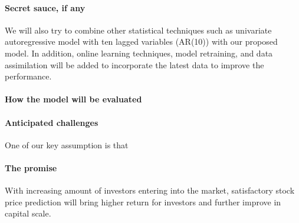 \documentclass{article}
\begin{document}
\paragraph{Secret sauce, if any}
We will also try to combine other statistical techniques such as univariate autoregressive model with ten lagged variables (AR(10)) with our proposed model. In addition, online learning techniques, model retraining, and data assimilation will be added to incorporate the latest data to improve the performance.

\paragraph{How the model will be evaluated}

\paragraph{Anticipated challenges}
One of our key assumption is that

\paragraph{The promise}
With increasing amount of investors entering into the market, satisfactory stock price prediction will bring higher return for investors and further improve in capital scale.

\newpage


\end{document}
